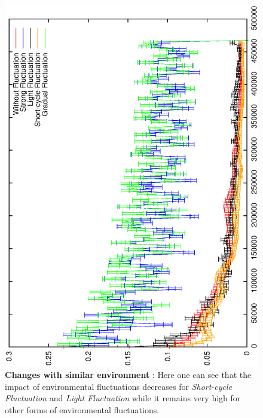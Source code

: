 \documentclass[letterpaper]{article}
\begin{document}
\begin{figure}[h]
\centering
\includegraphics[width=0.7\columnwidth, angle =-90 ]{img/ProgressProp}
\caption{\textbf{Changes with similar environment} : Here one can see that the impact of environmental fluctuations decreases for \emph{Short-cycle  Fluctuation} and  \emph{Light  Fluctuation}  while it remains very high for other forms of environmental fluctuations.
}
\label{Mutations}
\end{figure}
\end{document}
